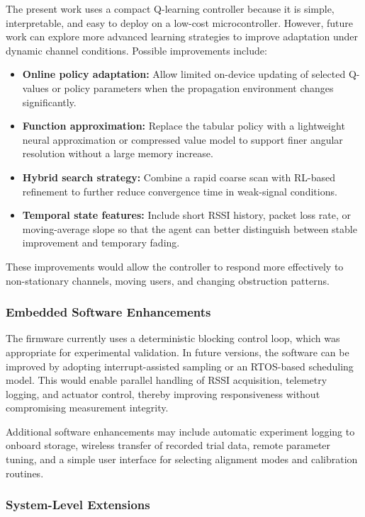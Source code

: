 The present work uses a compact Q-learning controller because it is simple, interpretable,
and easy to deploy on a low-cost microcontroller. However, future work can explore more
advanced learning strategies to improve adaptation under dynamic channel conditions.
Possible improvements include:
\begin{itemize}
    \item \textbf{Online policy adaptation:} Allow limited on-device updating of selected Q-values or policy parameters when the propagation environment changes significantly.
    \item \textbf{Function approximation:} Replace the tabular policy with a lightweight neural approximation or compressed value model to support finer angular resolution without a large memory increase.
    \item \textbf{Hybrid search strategy:} Combine a rapid coarse scan with RL-based refinement to further reduce convergence time in weak-signal conditions.
    \item \textbf{Temporal state features:} Include short RSSI history, packet loss rate, or moving-average slope so that the agent can better distinguish between stable improvement and temporary fading.
\end{itemize}

These improvements would allow the controller to respond more effectively to non-stationary
channels, moving users, and changing obstruction patterns.

\subsubsection{Embedded Software Enhancements}

The firmware currently uses a deterministic blocking control loop, which was appropriate
for experimental validation. In future versions, the software can be improved by adopting
interrupt-assisted sampling or an RTOS-based scheduling model. This would enable parallel
handling of RSSI acquisition, telemetry logging, and actuator control, thereby improving
responsiveness without compromising measurement integrity.

Additional software enhancements may include automatic experiment logging to onboard
storage, wireless transfer of recorded trial data, remote parameter tuning, and a simple
user interface for selecting alignment modes and calibration routines.

\subsubsection{System-Level Extensions}

